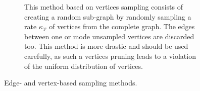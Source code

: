 \documentclass{article}
\begin{document}
\begin{figure}[h!]
\begin{subfigure}[t]{0.48\textwidth}
        \caption{This method based on vertices sampling consists of creating a random sub-graph by randomly sampling a rate $\kappa_\mathcal{V}$ of vertices from the complete graph. The edges between one or mode unsampled vertices are discarded too. This method is more drastic and should be used carefully, as such a vertices pruning leads to a violation of the uniform distribution of vertices.}
    \end{subfigure}
    \caption{Edge- and vertex-based sampling methods.}
    \label{fig:sampling}
\end{figure}

\end{document}

